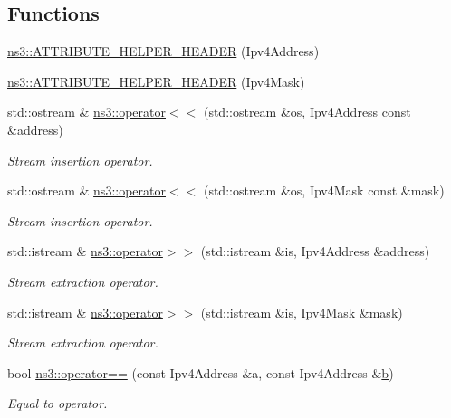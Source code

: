 \subsection*{Functions}
\begin{DoxyCompactItemize}
\item 
\hyperlink{namespacens3_ae23b03583bf29c235accb3ccc9f77c2b}{ns3\+::\+A\+T\+T\+R\+I\+B\+U\+T\+E\+\_\+\+H\+E\+L\+P\+E\+R\+\_\+\+H\+E\+A\+D\+ER} (Ipv4\+Address)
\item 
\hyperlink{namespacens3_a97d89a51ac2584f1d0f805f4b98407f8}{ns3\+::\+A\+T\+T\+R\+I\+B\+U\+T\+E\+\_\+\+H\+E\+L\+P\+E\+R\+\_\+\+H\+E\+A\+D\+ER} (Ipv4\+Mask)
\item 
std\+::ostream \& \hyperlink{namespacens3_a2e42d09da8ec97eca2b163074577f91d}{ns3\+::operator$<$$<$} (std\+::ostream \&os, Ipv4\+Address const \&address)
\begin{DoxyCompactList}\small\item\em Stream insertion operator. \end{DoxyCompactList}\item 
std\+::ostream \& \hyperlink{namespacens3_aec2b5a9d9fc57f99295da6846f0d7d84}{ns3\+::operator$<$$<$} (std\+::ostream \&os, Ipv4\+Mask const \&mask)
\begin{DoxyCompactList}\small\item\em Stream insertion operator. \end{DoxyCompactList}\item 
std\+::istream \& \hyperlink{namespacens3_a8f45477579279b657011b3f9b2afa3ba}{ns3\+::operator$>$$>$} (std\+::istream \&is, Ipv4\+Address \&address)
\begin{DoxyCompactList}\small\item\em Stream extraction operator. \end{DoxyCompactList}\item 
std\+::istream \& \hyperlink{namespacens3_a67a1db42c6476a71c39e4f6b43d98729}{ns3\+::operator$>$$>$} (std\+::istream \&is, Ipv4\+Mask \&mask)
\begin{DoxyCompactList}\small\item\em Stream extraction operator. \end{DoxyCompactList}\item 
bool \hyperlink{namespacens3_a0fe58b96feacec36f5b471217c1e00a5}{ns3\+::operator==} (const Ipv4\+Address \&a, const Ipv4\+Address \&\hyperlink{lte__pathloss_8m_a21ad0bd836b90d08f4cf640b4c298e7c}{b})
\begin{DoxyCompactList}\small\item\em Equal to operator. \end{DoxyCompactList}\item 

\end{DoxyCompactItemize}
